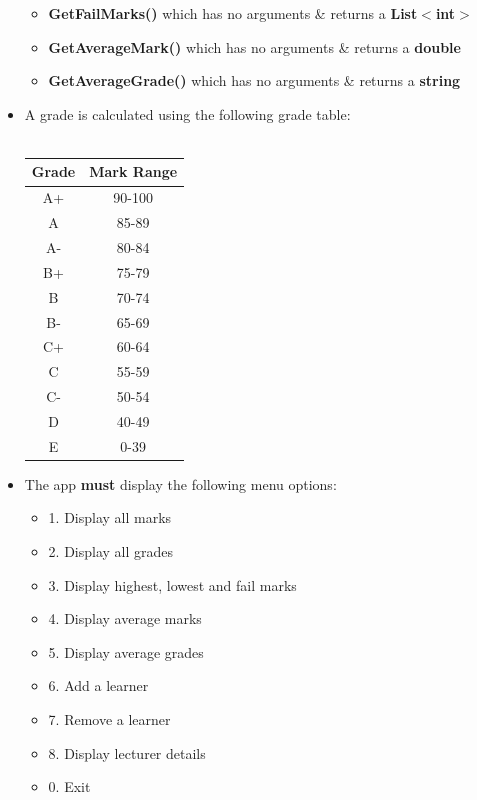 \documentclass{article}
\begin{document}
\begin{itemize}
\begin{itemize}
        \item \textbf{GetFailMarks()} which has no arguments \& returns a \textbf{List$<$int$>$}
        \item \textbf{GetAverageMark()} which has no arguments \& returns a \textbf{double}
        \item \textbf{GetAverageGrade()} which has no arguments \& returns a \textbf{string}
    \end{itemize}
    \item A grade is calculated using the following grade table:\\\\
    \renewcommand{\arraystretch}{1.5} 
    \begin{tabular}{|c|c|}
        \hline
        \textbf{Grade} & \textbf{Mark Range} \\ \hline
        A+ & 90-100  \\ \hline
        A & 85-89  \\ \hline
        A- & 80-84 \\ \hline
        B+ & 75-79   \\ \hline
        B & 70-74  \\ \hline
        B- & 65-69  \\ \hline
        C+ & 60-64  \\ \hline
        C & 55-59 \\ \hline
        C- & 50-54  \\ \hline
        D & 40-49   \\ \hline
        E & 0-39   \\ \hline
    \end{tabular}
    \item The app \textbf{must} display the following menu options:
    \begin{itemize}
        \item 1. Display all marks
        \item 2. Display all grades
        \item 3. Display highest, lowest and fail marks
        \item 4. Display average marks
        \item 5. Display average grades
        \item 6. Add a learner
        \item 7. Remove a learner
        \item 8. Display lecturer details
        \item 0. Exit
    \end{itemize}

\end{itemize}
\end{document}
